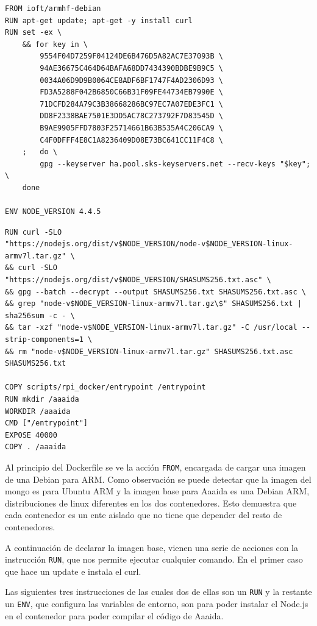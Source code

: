 \begin{lstlisting}[style=Bash]
FROM ioft/armhf-debian
RUN apt-get update; apt-get -y install curl
RUN set -ex \  
	&& for key in \    
		9554F04D7259F04124DE6B476D5A82AC7E37093B \ 
        94AE36675C464D64BAFA68DD7434390BDBE9B9C5 \
        0034A06D9D9B0064CE8ADF6BF1747F4AD2306D93 \ 
        FD3A5288F042B6850C66B31F09FE44734EB7990E \    
        71DCFD284A79C3B38668286BC97EC7A07EDE3FC1 \    
        DD8F2338BAE7501E3DD5AC78C273792F7D83545D \    
        B9AE9905FFD7803F25714661B63B535A4C206CA9 \    
        C4F0DFFF4E8C1A8236409D08E73BC641CC11F4C8 \  
	; 	do \  
		gpg --keyserver ha.pool.sks-keyservers.net --recv-keys "$key"; \  
	done

ENV NODE_VERSION 4.4.5
\end{lstlisting}
\pagebreak
\begin{lstlisting}[style=Bash]
RUN curl -SLO 
"https://nodejs.org/dist/v$NODE_VERSION/node-v$NODE_VERSION-linux-armv7l.tar.gz" \  
&& curl -SLO "https://nodejs.org/dist/v$NODE_VERSION/SHASUMS256.txt.asc" \  
&& gpg --batch --decrypt --output SHASUMS256.txt SHASUMS256.txt.asc \  
&& grep "node-v$NODE_VERSION-linux-armv7l.tar.gz\$" SHASUMS256.txt | sha256sum -c - \  
&& tar -xzf "node-v$NODE_VERSION-linux-armv7l.tar.gz" -C /usr/local --strip-components=1 \  
&& rm "node-v$NODE_VERSION-linux-armv7l.tar.gz" SHASUMS256.txt.asc SHASUMS256.txt

COPY scripts/rpi_docker/entrypoint /entrypoint
RUN mkdir /aaaida
WORKDIR /aaaida
CMD ["/entrypoint"]
EXPOSE 40000
COPY . /aaaida
\end{lstlisting}

Al principio del Dockerfile se ve la acción \texttt{FROM}, encargada de cargar una imagen de una Debian para ARM. Como observación se puede detectar que la imagen del mongo es para Ubuntu ARM y la imagen base para Aaaida es una Debian ARM, distribuciones de linux diferentes en los dos contenedores. Esto demuestra que cada contenedor es un ente aislado que no tiene que depender del resto de contenedores.
 
A continuación de declarar la imagen base, vienen una serie de acciones con la instrucción \texttt{RUN}, que nos permite ejecutar cualquier comando. En el primer caso que hace un update e instala el curl.
 
Las siguientes tres instrucciones de las cuales dos de ellas son un \texttt{RUN} y la restante un \texttt{ENV}, que configura las variables de entorno, son para poder instalar el Node.js en el contenedor para poder compilar el código de Aaaida.
 
